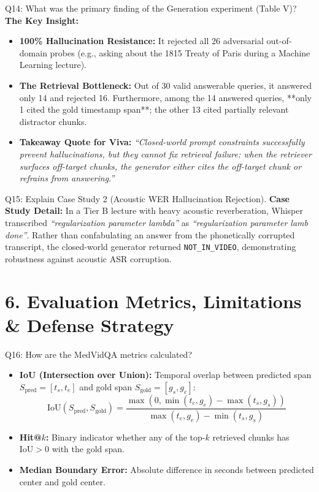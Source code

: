 \documentclass[10pt,a4paper]{article}
\begin{document}
\begin{quesbox}{Q14: What was the primary finding of the Generation experiment (Table V)?}
\textbf{The Key Insight:}
\begin{itemize}[leftmargin=*]
    \item \textbf{100\% Hallucination Resistance:} It rejected all 26 adversarial out-of-domain probes (e.g., asking about the 1815 Treaty of Paris during a Machine Learning lecture).
    \item \textbf{The Retrieval Bottleneck:} Out of 30 valid answerable queries, it answered only 14 and rejected 16. Furthermore, among the 14 answered queries, **only 1 cited the gold timestamp span**; the other 13 cited partially relevant distractor chunks.
    \item \textbf{Takeaway Quote for Viva:} \textit{``Closed-world prompt constraints successfully prevent hallucinations, but they cannot fix retrieval failure: when the retriever surfaces off-target chunks, the generator either cites the off-target chunk or refrains from answering.''}
\end{itemize}
\end{quesbox}

\begin{quesbox}{Q15: Explain Case Study 2 (Acoustic WER Hallucination Rejection).}
\textbf{Case Study Detail:}
In a Tier B lecture with heavy acoustic reverberation, Whisper transcribed \textit{``regularization parameter lambda''} as \textit{``regularization parameter lamb done''}. Rather than confabulating an answer from the phonetically corrupted transcript, the closed-world generator returned \texttt{NOT\_IN\_VIDEO}, demonstrating robustness against acoustic ASR corruption.
\end{quesbox}

\section*{\color{primary} 6. Evaluation Metrics, Limitations \& Defense Strategy}

\begin{quesbox}{Q16: How are the MedVidQA metrics calculated?}
\begin{itemize}[leftmargin=*]
    \item \textbf{IoU (Intersection over Union):} Temporal overlap between predicted span $S_{\text{pred}} = [t_{s}, t_{e}]$ and gold span $S_{\text{gold}} = [g_{s}, g_{e}]$:
    $$\text{IoU}(S_{\text{pred}}, S_{\text{gold}}) = \frac{\max(0, \min(t_{e}, g_{e}) - \max(t_{s}, g_{s}))}{\max(t_{e}, g_{e}) - \min(t_{s}, g_{s})}$$
    \item \textbf{Hit@$k$:} Binary indicator whether any of the top-$k$ retrieved chunks has $\text{IoU} > 0$ with the gold span.
    \item \textbf{Median Boundary Error:} Absolute difference in seconds between predicted center and gold center.
\end{itemize}
\end{quesbox}
\end{document}
